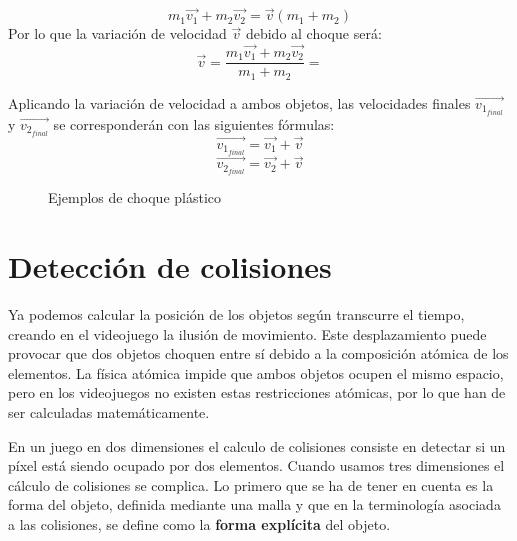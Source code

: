 $$ m_1 \vec{v_1} + m_2 \vec{v_2} = \vec{v} ( m_1 + m_2 ) $$
Por lo que la variación de velocidad $\vec{v}$ debido al choque será:
$$  \vec{v} = \frac{ m_1 \vec{v_1} + m_2 \vec{v_2}}{ m_1 + m_2 } =$$

Aplicando la variación de velocidad a ambos objetos, las velocidades finales $\vec{v_{1_{final}}}$ y $\vec{v_{2_{final}}}$ se corresponderán con las siguientes fórmulas:
$$ \vec{v_{1_{final}}} = \vec{v_1} + \vec{v} $$
$$ \vec{v_{2_{final}}} = \vec{v_2} + \vec{v} $$
	
\begin{figure}[!h]
	\centering	
	 \hspace*{1cm}
	\caption{Ejemplos de choque plástico}
\end{figure}

\section{Detección de colisiones}

Ya podemos calcular la posición de los objetos según transcurre el tiempo, creando en el videojuego la ilusión de movimiento. Este desplazamiento puede provocar que dos objetos choquen entre sí debido a la composición atómica de los elementos. La física atómica impide que ambos objetos ocupen el mismo espacio, pero en los videojuegos no existen estas restricciones atómicas, por lo que han de ser calculadas matemáticamente.
\newline

En un juego en dos dimensiones el calculo de colisiones consiste en detectar si un píxel está siendo ocupado por dos elementos. Cuando usamos tres dimensiones el cálculo de colisiones se complica. Lo primero que se ha de tener en cuenta es la forma del objeto, definida mediante una malla y que en la terminología asociada a las colisiones, se define como la \textbf{forma explícita} del objeto. 
\newline

